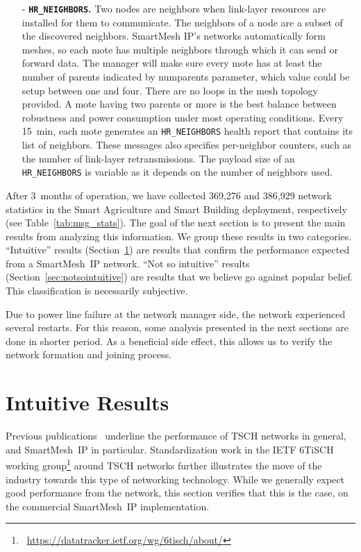 \documentclass{elsarticle}
\newcommand{\smip}                {SmartMesh~IP\xspace}
\newcommand{\building}            {Smart Building\xspace}
\newcommand{\agri}                {Smart Agriculture\xspace}
\newcommand{\HRNEIGHBORS}         {{\tt HR\_NEIGHBORS}\xspace}
\newcommand{\PEACHNUMSTATS}       {369,276\xspace}
\newcommand{\EVANUMSTATS}         {386,929\xspace}
\begin{document}
\begin{itemize}
    \item[-] \textbf{\HRNEIGHBORS.}
        Two nodes are neighbors when link-layer resources are installed for them to communicate.
        The neighbors of a node are a subset of the discovered neighbors.
        SmartMesh IP's networks automatically form meshes, so each mote has multiple neighbors 
        through which it can send or forward data. 
        The manager will make sure every mote has at least the number of parents indicated by numparents parameter, 
        which value could be setup between one and four. 
        There are no loops in the mesh topology provided. 
        A mote having two parents or more is the best balance between robustness and power consumption under most operating conditions.
        Every 15~min, each mote generates an \HRNEIGHBORS health report that contains its list of neighbors.
        These messages also specifies per-neighbor counters, such as the number of link-layer retransmissions.
        The payload size of an \HRNEIGHBORS is variable as it depends on the number of neighbors used.
\end{itemize}


After 3~months of operation, we have collected \PEACHNUMSTATS and \EVANUMSTATS network statistics in the \agri and \building deployment, respectively (see Table~\ref{tab:msg_stats}).
The goal of the next section is to present the main results from analyzing this information.
We group these results in two categories.
``Intuitive'' results (Section~\ref{sec:intuitive}) are results that confirm the performance expected from a \smip network.
``Not so intuitive'' results (Section~\ref{sec:notsointuitive}) are results that we believe go against popular belief.
This classification is necessarily subjective.

Due to power line failure at the network manager side, the network experienced several restarts.
For this reason, some analysis presented in the next sections are done in shorter period.
As a beneficial side effect, this allows us to verify the network formation and joining process.

\section{Intuitive Results}
\label{sec:intuitive}


Previous publications~\cite{watteyne16peach,watteyne10mitigating,watteyne09reliability,watteyne15industrial} underline the performance of TSCH networks in general, and \smip in particular.
Standardization work in the IETF 6TiSCH working group\footnote{~\url{https://datatracker.ietf.org/wg/6tisch/about/}} around TSCH networks further illustrates the move of the industry towards this type of networking technology.
While we generally expect good performance from the network, this section verifies that this is the case, on the commercial \smip implementation.
\end{document}
